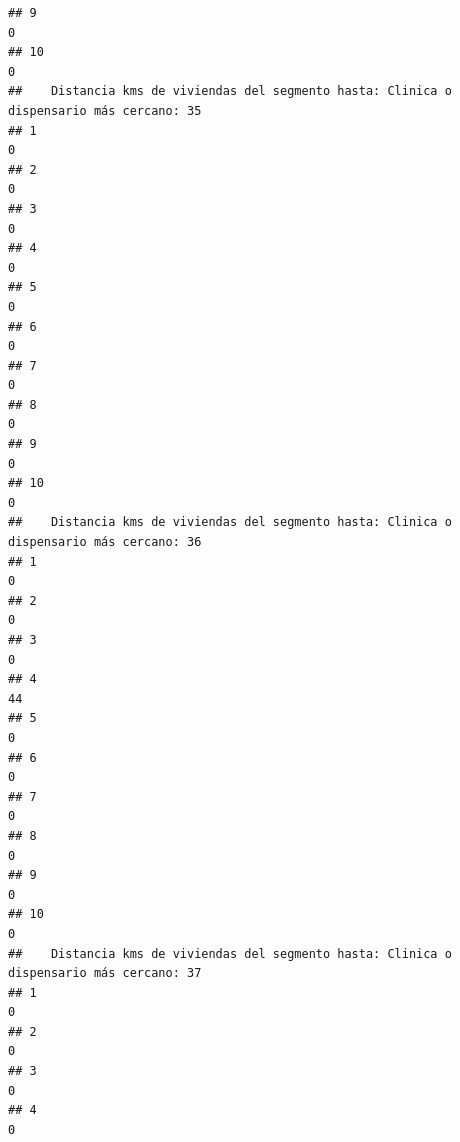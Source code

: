 \documentclass[11pt,]{article}
\begin{document}
\begin{verbatim}
## 9                                                                                     0
## 10                                                                                    0
##    Distancia kms de viviendas del segmento hasta: Clinica o dispensario más cercano: 35
## 1                                                                                     0
## 2                                                                                     0
## 3                                                                                     0
## 4                                                                                     0
## 5                                                                                     0
## 6                                                                                     0
## 7                                                                                     0
## 8                                                                                     0
## 9                                                                                     0
## 10                                                                                    0
##    Distancia kms de viviendas del segmento hasta: Clinica o dispensario más cercano: 36
## 1                                                                                     0
## 2                                                                                     0
## 3                                                                                     0
## 4                                                                                    44
## 5                                                                                     0
## 6                                                                                     0
## 7                                                                                     0
## 8                                                                                     0
## 9                                                                                     0
## 10                                                                                    0
##    Distancia kms de viviendas del segmento hasta: Clinica o dispensario más cercano: 37
## 1                                                                                     0
## 2                                                                                     0
## 3                                                                                     0
## 4                                                                                     0

\end{verbatim}
\end{document}
